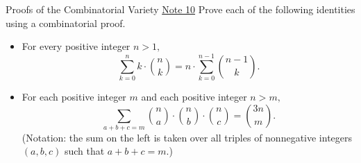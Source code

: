 \begin{homeworkProblem}{Proofs of the Combinatorial Variety}
\href{https://www.eecs70.org/assets/pdf/notes/n10.pdf}{Note 10}
Prove each of the following identities using a combinatorial proof.

\begin{itemize}

\item For every positive integer $n>1,$ 
\[\sum_{k=0}^n k \cdot \binom{n}{k} = n\cdot \sum_{k=0}^{n - 1}\binom{n - 1}{k}.\]

\solution

\item For each positive integer $m$ and each positive integer $n > m,$
\[\sum_{a + b + c = m} \binom{n}{a}\cdot\binom{n}{b}\cdot\binom{n}{c} = \binom{3n}{m}.\]
(Notation: the sum on the left is taken over all triples of nonnegative integers $(a,b,c)$ such that $a + b + c = m.$)

\solution

\end{itemize}
\end{homeworkProblem}
